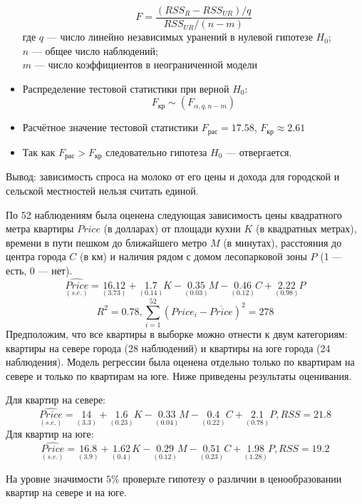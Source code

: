 \documentclass[pdftex,11pt,openany]{book}\usepackage[]{graphicx}\usepackage[]{color}
\begin{document}
\begin{solution}
\begin{itemize}
\[ 
F = \frac{(RSS_R-RSS_{UR})/q}{RSS_{UR}/(n-m)}
\]
где $q$ --- число линейно независимых уранений в нулевой гипотезе $H_0$;\\
$n$ --- общее число наблюдений;\\
$m$ --- число коэффициентов в неограниченной модели
\item Распределение тестовой статистики при верной $H_0$:
\[
F_{\text{кр}}\sim(F_{\alpha,q,n-m})
\]
\item Расчётное значение тестовой статистики $F_{\text{рас}}=17.58$, $F_{\text{кр}}\approx 2.61$
\item Так как $F_{\text{рас}}>F_{\text{кр}}$ следовательно гипотеза $H_0$ --- отвергается.
\end{itemize}
Вывод: зависимость спроса на молоко от его цены и дохода  для городской и сельской местностей нельзя считать единой.
\end{solution}


\begin{problem} %
 По 52 наблюдениям была оценена следующая зависимость цены квадратного метра квартиры $Price$ (в долларах) от площади кухни $K$ (в квадратных метрах), времени в пути пешком до ближайшего метро $M$ (в минутах), расстояния до центра города $C$ (в км) и наличия рядом с домом лесопарковой зоны $P$ (1 --- есть, 0 --- нет).
\[
\underset{(s.e.)}{\widehat{Price}}=\underset{(3.73)}{16.12}+\underset{(0.14)}{1.7}K-\underset{(0.03)}{0.35}M-\underset{(0.12)}{0.46}C+\underset{(0.98)}{2.22}P
\]
\[
R^2=0.78, \sum_{i=1}^{52} {(Price_i-\overline{Price})^2}=278
\]
Предположим, что все квартиры в выборке можно отнести к двум категориям: квартиры на севере города (28 наблюдений) и квартиры на юге города (24 наблюдения). Модель регрессии была оценена отдельно только по квартирам на севере и только по квартирам на юге. Ниже приведены результаты оценивания.

Для квартир на севере:
\[
\underset{(s.e.)}{\widehat{Price}}=\underset{(3.3)}{14}+\underset{(0.23)}{1.6}K-\underset{(0.04)}{0.33}M-\underset{(0.22)}{0.4}C+\underset{(0.78)}{2.1}P, RSS=21.8
\]
Для квартир на юге:
\[
\underset{(s.e.)}{\widehat{Price}}=\underset{(3.9)}{16.8}+\underset{(0.4)}{1.62}K-\underset{(0.12)}{0.29}M-\underset{(0.23)}{0.51}C+\underset{(1.28)}{1.98}P, RSS=19.2
\]

На уровне значимости $5\%$ проверьте гипотезу о различии в ценообразовании квартир на севере и на юге.
\end{problem}

\begin{solution}
\end{solution}
\end{document}
